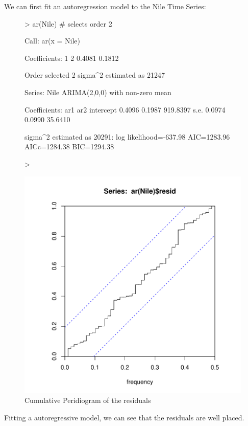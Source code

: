 \documentclass[11pt, a4paper]{article} %
\begin{document}
We can first fit an autoregression model to the Nile Time Series:
\begin{figure}[H]
\centering
\begin{Schunk}
\begin{Sinput}
> ar(Nile) # selects order 2
\end{Sinput}
\begin{Soutput}
Call:
ar(x = Nile)

Coefficients:
     1       2  
0.4081  0.1812  

Order selected 2  sigma^2 estimated as  21247
\end{Soutput}
\begin{Soutput}
Series: Nile 
ARIMA(2,0,0) with non-zero mean 

Coefficients:
         ar1     ar2  intercept
      0.4096  0.1987   919.8397
s.e.  0.0974  0.0990    35.6410

sigma^2 estimated as 20291:  log likelihood=-637.98
AIC=1283.96   AICc=1284.38   BIC=1294.38
\end{Soutput}
\begin{Sinput}
> 
\end{Sinput}
\end{Schunk}
\includegraphics{sweaveclean-027}
\caption{Cumulative Peridiogram of the residuals}
\end{figure}
Fitting a autoregressive model, we can see that the residuals are well placed.
\end{document}
